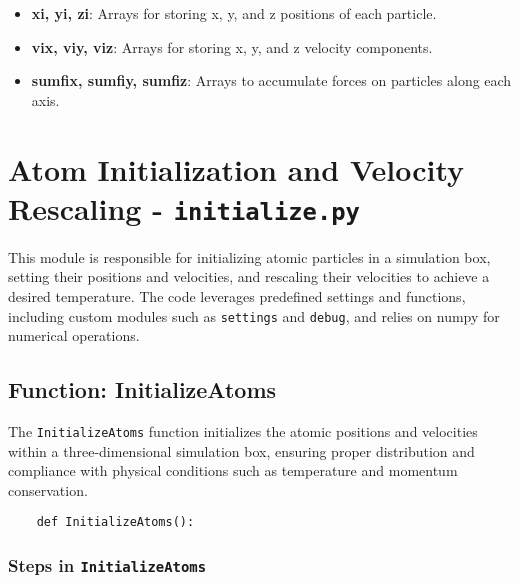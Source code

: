 \documentclass[12pt, ngerman]{report}
\begin{document}
\begin{itemize}
	\item \textbf{xi, yi, zi}: Arrays for storing x, y, and z positions of each particle.
	\item \textbf{vix, viy, viz}: Arrays for storing x, y, and z velocity components.
	\item \textbf{sumfix, sumfiy, sumfiz}: Arrays to accumulate forces on particles along each axis.
\end{itemize}



\chapter{Atom Initialization and Velocity Rescaling - \texttt{initialize.py}}
\label{chap:atom_initialization}

This module is responsible for initializing atomic particles in a simulation box, setting their positions and velocities, and rescaling their velocities to achieve a desired temperature. The code leverages predefined settings and functions, including custom modules such as \texttt{settings} and \texttt{debug}, and relies on numpy for numerical operations.

\section{Function: InitializeAtoms}
\label{sec:initialize_atoms}

The \texttt{InitializeAtoms} function initializes the atomic positions and velocities within a three-dimensional simulation box, ensuring proper distribution and compliance with physical conditions such as temperature and momentum conservation.

\begin{verbatim}
	def InitializeAtoms():
\end{verbatim}

\subsection*{Steps in \texttt{InitializeAtoms}}
\end{document}
